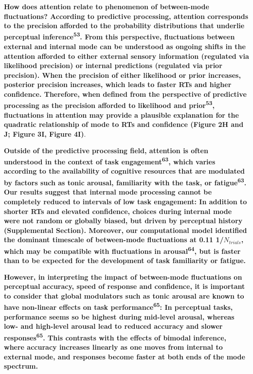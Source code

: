 \documentclass[
]{article}
\begin{document}
\textbf{How does attention relate to phenomenon of between-mode
fluctuations? According to predictive processing, attention corresponds
to the precision afforded to the probability distributions that underlie
perceptual inference\textsuperscript{53}. From this perspective,
fluctuations between external and internal mode can be understood as
ongoing shifts in the attention afforded to either external sensory
information (regulated via likelihood precision) or internal predictions
(regulated via prior precision). When the precision of either likelihood
or prior increases, posterior precision increases, which leads to faster
RTs and higher confidence. Therefore, when defined from the perspective
of predictive processing as the precision afforded to likelihood and
prior\textsuperscript{53}, fluctuations in attention may provide a
plausible explanation for the quadratic relationship of mode to RTs and
confidence (Figure 2H and J; Figure 3I, Figure 4I)}.

\textbf{Outside of the predictive processing field, attention is often
understood in the context of task engagement\textsuperscript{63}, which
varies according to the availability of cognitive resources that are
modulated by factors such as tonic arousal, familiarity with the task,
or fatigue\textsuperscript{63}. Our results suggest that internal mode
processing cannot be completely reduced to intervals of low task
engagement: In addition to shorter RTs and elevated confidence, choices
during internal mode were not random or globally biased, but driven by
perceptual history (Supplemental Section). Moreover, our computational
model identified the dominant timescale of between-mode fluctuations at
0.11 1/\(N_{trials}\), which may be compatible with fluctuations in
arousal\textsuperscript{64}, but is faster than to be expected for the
development of task familiarity or fatigue.}

\textbf{However, in interpreting the impact of between-mode fluctuations
on perceptual accuracy, speed of response and confidence, it is
important to consider that global modulators such as tonic arousal are
known to have non-linear effects on task
performance\textsuperscript{65}: In perceptual tasks, performance seems
so be highest during mid-level arousal, whereas low- and high-level
arousal lead to reduced accuracy and slower
responses\textsuperscript{65}. This contrasts with the effects of
bimodal inference, where accuracy increases linearly as one moves from
internal to external mode, and responses become faster at both ends of
the mode spectrum.}
\end{document}
